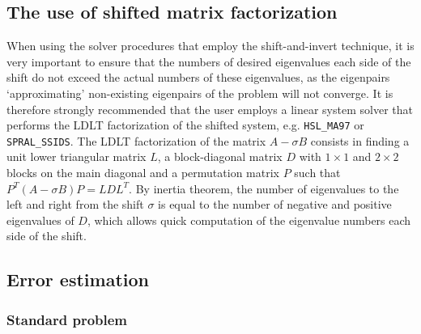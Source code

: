\subsection{The use of shifted matrix factorization}
\label{ssmfe_expert:sec:si}

When using the solver procedures that employ the shift-and-invert technique,
it is very important to ensure that the numbers of desired eigenvalues
each side of the shift do not exceed the actual numbers of these eigenvalues,
as the eigenpairs `approximating' non-existing eigenpairs of the problem
will not converge.
It is therefore strongly recommended that the user employs 
a linear system solver that performs
the LDLT
factorization of %
the shifted system,
e.g. {\tt HSL\_MA97} or {\tt SPRAL\_SSIDS}.
The LDLT factorization of the matrix
$A - \sigma B$ consists in finding a unit lower triangular
matrix $L$, a block-diagonal matrix $D$
with $1\times 1$ and $2\times 2$ blocks on the main diagonal
and a permutation matrix $P$
such that $P^T(A - \sigma B)P = L D L^T$.
By inertia theorem,
the number of eigenvalues to the left and right from 
the shift $\sigma$
is equal to the number of negative and positive eigenvalues of $D$,
which allows quick computation of the eigenvalue numbers
each side of the shift. %

\subsection{Error estimation}

\label{ssmfe_expert:errors:est}

\subsubsection{Standard problem}

